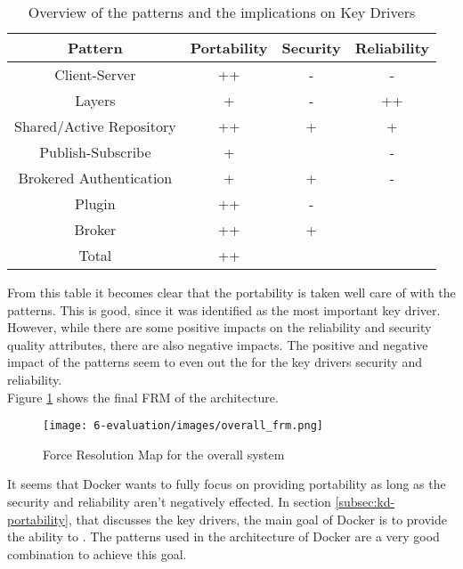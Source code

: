 \begin{table}[H]
\caption{Overview of the patterns and the implications on Key Drivers}
\label{tab:qa-overview}

\begin{tabular}{|c|c|c|c|}
\hline \textbf{Pattern} & \textbf{Portability} & \textbf{Security} & \textbf{Reliability} \\ 
\hline Client-Server 					& ++ 	& - 	& - 	\\ 
\hline Layers 							& + 	& - 	& ++ 	\\ 
\hline Shared/Active Repository 		& ++ 	& + 	& + 	\\ 
\hline Publish-Subscribe 				& + 	& \s 	& - 	\\ 
\hline Brokered Authentication 			& + 	& + 	& - 	\\ 
\hline Plugin 							& ++ 	& - 	& \s 	\\ 
\hline Broker 							& ++ 	& + 	& \s 	\\ 
\hline Total							& ++   	& \s	& \s	\\
\hline
\end{tabular} 
\end{table}

 From this table it becomes clear that the portability is taken well care of with the patterns. This is good, since it was identified as the most important key driver.\\
However, while there are some positive impacts on the reliability and security quality attributes, there are also negative impacts. The  positive and negative impact of the patterns seem to even out the for the key drivers security and reliability.\\
Figure \ref{fig:eval-overall} shows the final FRM of the architecture.

\begin{figure}[H]
\centering
\texttt{[image: 6-evaluation/images/overall\_frm.png]}
\caption{Force Resolution Map for the overall system}
\label{fig:eval-overall}
\end{figure}

It seems that Docker wants to fully focus on providing portability as long as the security and reliability aren't negatively effected. In section \ref{subsec:kd-portability}, that discusses the key drivers, the main goal of Docker is to provide the ability to .  The patterns used in the architecture of Docker are a very good combination to achieve this goal.